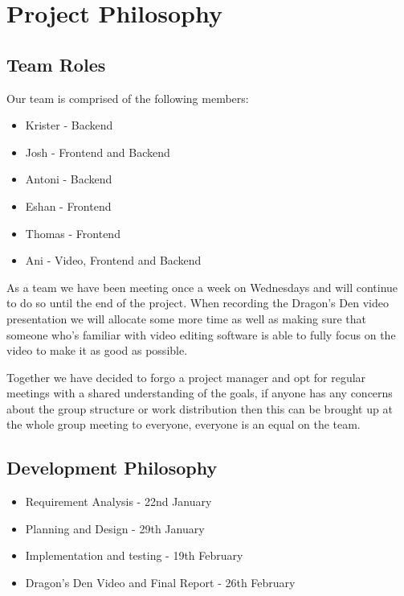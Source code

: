 \documentclass{article}
\begin{document}
\section{Project Philosophy}
\subsection{Team Roles}
Our team is comprised of the following members:

\begin{itemize}
  \item Krister - Backend 
  \item Josh - Frontend and Backend 
  \item Antoni - Backend 
  \item Eshan -  Frontend
  \item Thomas - Frontend
  \item Ani - Video, Frontend and Backend
\end{itemize}

As a team we have been meeting once a week on Wednesdays and will continue to do 
so until the end of the project. When recording the Dragon's Den video presentation 
we will allocate some more time as well as making sure that someone who's familiar 
with video editing software is able to fully focus on the video to make it as good
as possible. 

Together we have decided to forgo a project manager and opt for regular meetings 
with a shared understanding of the goals, if anyone has any concerns about the group 
structure or work distribution then this can be brought up at the whole group meeting 
to everyone, everyone is an equal on the team.

\subsection{Development Philosophy}
\begin{itemize}
  \item Requirement Analysis
        - 22nd January
  \item Planning and Design
        - 29th January
  \item Implementation and testing
        - 19th February
  \item Dragon's Den Video and Final Report
        - 26th February
\end{itemize}
\end{document}

